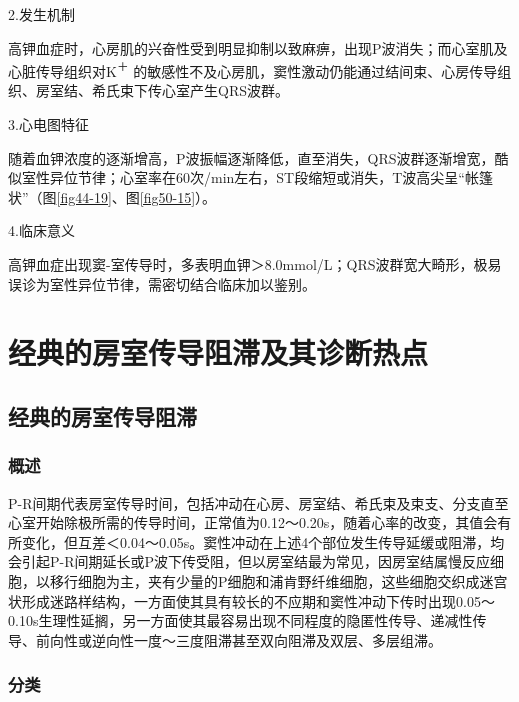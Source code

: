 2.发生机制

高钾血症时，心房肌的兴奋性受到明显抑制以致麻痹，出现P波消失；而心室肌及心脏传导组织对K\textsuperscript{＋}
的敏感性不及心房肌，窦性激动仍能通过结间束、心房传导组织、房室结、希氏束下传心室产生QRS波群。

3.心电图特征

随着血钾浓度的逐渐增高，P波振幅逐渐降低，直至消失，QRS波群逐渐增宽，酷似室性异位节律；心室率在60次/min左右，ST段缩短或消失，T波高尖呈“帐篷状”（图\ref{fig44-19}、图\ref{fig50-15}）。

4.临床意义

高钾血症出现窦-室传导时，多表明血钾＞8.0mmol/L；QRS波群宽大畸形，极易误诊为室性异位节律，需密切结合临床加以鉴别。

\protect\hypertarget{text00027.html}{}{}

\protect\hypertarget{text00027.htmlux5cux23chapter27}{}{}

\chapter{经典的房室传导阻滞及其诊断热点}

\protect\hypertarget{text00027.htmlux5cux23subid323}{}{}

\section{经典的房室传导阻滞}

\protect\hypertarget{text00027.htmlux5cux23subid324}{}{}

\subsection{概述}

P-R间期代表房室传导时间，包括冲动在心房、房室结、希氏束及束支、分支直至心室开始除极所需的传导时间，正常值为0.12～0.20s，随着心率的改变，其值会有所变化，但互差＜0.04～0.05s。窦性冲动在上述4个部位发生传导延缓或阻滞，均会引起P-R间期延长或P波下传受阻，但以房室结最为常见，因房室结属慢反应细胞，以移行细胞为主，夹有少量的P细胞和浦肯野纤维细胞，这些细胞交织成迷宫状形成迷路样结构，一方面使其具有较长的不应期和窦性冲动下传时出现0.05～0.10s生理性延搁，另一方面使其最容易出现不同程度的隐匿性传导、递减性传导、前向性或逆向性一度～三度阻滞甚至双向阻滞及双层、多层组滞。

\protect\hypertarget{text00027.htmlux5cux23subid325}{}{}

\subsection{分类}

